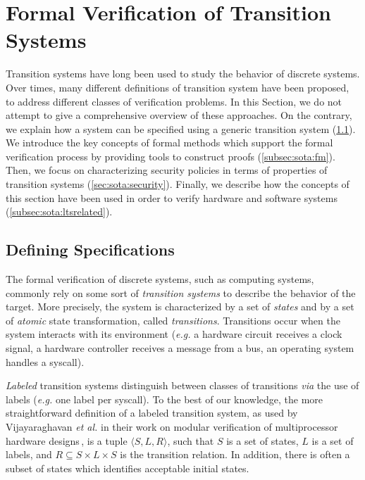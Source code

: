 \section{Formal Verification of Transition Systems}
\label{sec:sota:formalisms}

Transition systems have long been used to study the behavior of discrete
systems.
%
Over times, many different definitions of transition system have been
proposed, to address different classes of verification problems.
%
In this Section, we do not attempt to give a comprehensive overview of these
approaches.
%
On the contrary, we explain how a system can be specified using a generic
transition system (\ref{subsec:sota:ltsdef}).
%
We introduce the key concepts of formal methods which support the formal
verification process by providing tools to construct proofs
(\ref{subsec:sota:fm}).
%
Then, we focus on characterizing security policies in terms of properties of
transition systems (\ref{sec:sota:security}).
%
Finally, we describe how the concepts of this section have been used in order to
verify hardware and software systems (\ref{subsec:sota:ltsrelated}).

\subsection{Defining Specifications}
\label{subsec:sota:ltsdef}

The formal verification of discrete systems, such as computing systems, commonly
rely on some sort of \emph{transition systems} to describe the behavior of the
target.
%
More precisely, the system is characterized by a set of \emph{states} and by a
set of \emph{atomic} state transformation, called \emph{transitions}.
%
Transitions occur when the system interacts with its environment (\emph{e.g.} a
hardware circuit receives a clock signal, a hardware controller receives a
message from a bus, an operating system handles a syscall).

\emph{Labeled} transition systems distinguish between classes of transitions
\emph{via} the use of labels (\emph{e.g.} one label per syscall).
%
To the best of our knowledge, the more straightforward definition of a labeled
transition system, as used by Vijayaraghavan \emph{et al.} in their work on
modular verification of multiprocessor hardware
designs\,\cite{vijayaraghavan2015modular}, is a tuple
\( \langle S, L, R \rangle \), such that \( S \) is a set of states, \( L \) is
a set of labels, and \( R \subseteq S \times L \times S \) is the transition
relation.
%
In addition, there is often a subset of states which identifies acceptable
initial states.

